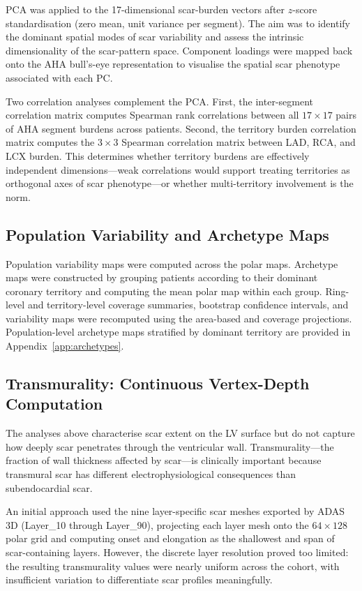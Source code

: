PCA was applied to the 17-dimensional scar-burden vectors after $z$-score standardisation
(zero mean, unit variance per segment). The aim was to identify the dominant spatial modes
of scar variability and assess the intrinsic dimensionality of the scar-pattern space.
Component loadings were mapped back onto the AHA bull's-eye representation to visualise
the spatial scar phenotype associated with each PC.

Two correlation analyses complement the PCA. First, the inter-segment correlation matrix
computes Spearman rank correlations between all $17 \times 17$ pairs of AHA segment
burdens across patients. Second, the territory burden correlation matrix
computes the $3 \times 3$ Spearman correlation matrix between LAD, RCA, and LCX burden.
This determines whether territory burdens are effectively independent dimensions---weak
correlations would support treating territories as orthogonal axes of scar phenotype---or
whether multi-territory involvement is the norm.

\subsection{Population Variability and Archetype Maps}

Population variability maps were computed across the polar maps. Archetype maps were
constructed by grouping patients according to their dominant coronary territory and
computing the mean polar map within each group. Ring-level and territory-level coverage
summaries, bootstrap confidence intervals, and variability maps were recomputed using the
area-based and coverage projections. Population-level archetype maps stratified by dominant
territory are provided in Appendix~\ref{app:archetypes}.

\subsection{Transmurality: Continuous Vertex-Depth Computation}

The analyses above characterise scar extent on the LV surface but do not capture how
deeply scar penetrates through the ventricular wall. Transmurality---the fraction of wall
thickness affected by scar---is clinically important because transmural scar has different
electrophysiological consequences than subendocardial scar.

An initial approach used the nine layer-specific scar meshes exported by ADAS 3D
(Layer\_10 through Layer\_90), projecting each layer mesh onto the $64 \times 128$ polar
grid and computing onset and elongation as the shallowest and span of scar-containing
layers. However, the discrete layer resolution proved too limited: the resulting transmurality
values were nearly uniform across the cohort, with insufficient variation to differentiate scar
profiles meaningfully.

